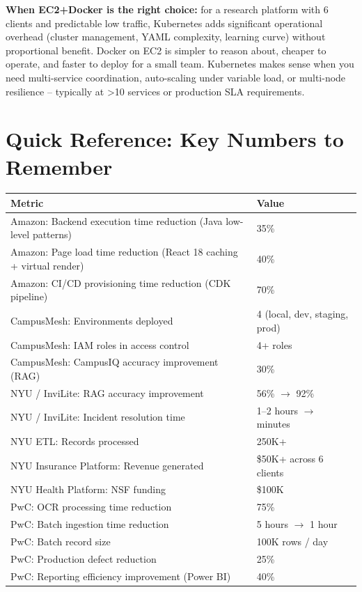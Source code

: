 \documentclass[letterpaper,10pt]{article}
\begin{document}
\textbf{When EC2+Docker is the right choice:} for a research platform with 6 clients and predictable low traffic, Kubernetes adds significant operational overhead (cluster management, YAML complexity, learning curve) without proportional benefit. Docker on EC2 is simpler to reason about, cheaper to operate, and faster to deploy for a small team. Kubernetes makes sense when you need multi-service coordination, auto-scaling under variable load, or multi-node resilience -- typically at \textgreater{}10 services or production SLA requirements.

\newpage

\section{Quick Reference: Key Numbers to Remember}

\begin{tabular}{ll}
\toprule
\textbf{Metric} & \textbf{Value} \\
\midrule
Amazon: Backend execution time reduction (Java low-level patterns) & 35\% \\
Amazon: Page load time reduction (React 18 caching + virtual render) & 40\% \\
Amazon: CI/CD provisioning time reduction (CDK pipeline) & 70\% \\
\midrule
CampusMesh: Environments deployed & 4 (local, dev, staging, prod) \\
CampusMesh: IAM roles in access control & 4+ roles \\
CampusMesh: CampusIQ accuracy improvement (RAG) & 30\% \\
\midrule
NYU / InviLite: RAG accuracy improvement & 56\% $\rightarrow$ 92\% \\
NYU / InviLite: Incident resolution time & 1--2 hours $\rightarrow$ minutes \\
NYU ETL: Records processed & 250K+ \\
NYU Insurance Platform: Revenue generated & \$50K+ across 6 clients \\
NYU Health Platform: NSF funding & \$100K \\
\midrule
PwC: OCR processing time reduction & 75\% \\
PwC: Batch ingestion time reduction & 5 hours $\rightarrow$ 1 hour \\
PwC: Batch record size & 100K rows / day \\
PwC: Production defect reduction & 25\% \\
PwC: Reporting efficiency improvement (Power BI) & 40\% \\
\bottomrule
\end{tabular}
\end{document}
